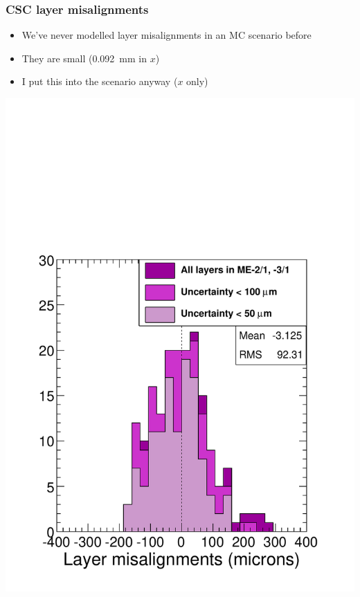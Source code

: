\documentclass[compress]{beamer}
\begin{document}
\begin{frame}
\frametitle{CSC layer misalignments}
\begin{itemize}
\item We've never modelled layer misalignments in an MC scenario before
\item They are small (0.092~mm in $x$)
\item I put this into the scenario anyway ($x$ only)
\end{itemize}

\begin{center}
\includegraphics[width=0.45\linewidth]{layer_hist.pdf}
\end{center}
\end{frame}
\end{document}
